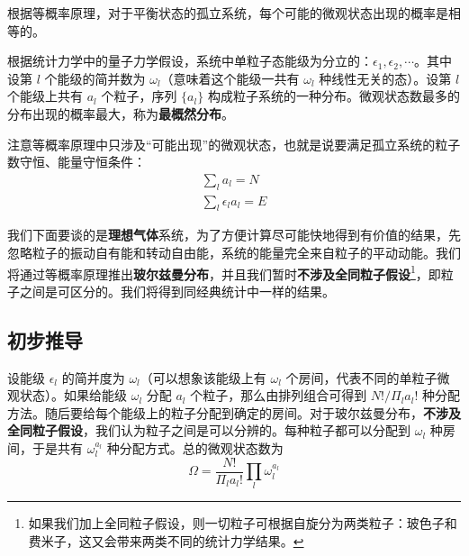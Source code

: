 

根据等概率原理，对于平衡状态的孤立系统，每个可能的微观状态出现的概率是相等的。

根据统计力学中的量子力学假设，系统中单粒子态能级为分立的：$\epsilon_1,\epsilon_2,\cdots$。其中设第 $l$ 个能级的简并数为 $\omega_l$（意味着这个能级一共有 $\omega_l$ 种线性无关的态）。设第 $l$ 个能级上共有 $a_l$ 个粒子，序列 $\{a_l\}$ 构成粒子系统的一种分布。微观状态数最多的分布出现的概率最大，称为\textbf{最概然分布}。

注意等概率原理中只涉及“可能出现”的微观状态，也就是说要满足孤立系统的粒子数守恒、能量守恒条件：
\begin{equation}\label{eq_MBsta_1}
\begin{aligned}
\sum_l a_l=N\\
\sum_l \epsilon_l a_l=E
\end{aligned}
\end{equation}

我们下面要谈的是\textbf{理想气体}系统，为了方便计算尽可能快地得到有价值的结果，先忽略粒子的振动自有能和转动自由能，系统的能量完全来自粒子的平动动能。我们将通过等概率原理推出\textbf{玻尔兹曼分布}，并且我们暂时\textbf{不涉及全同粒子假设}\footnote{如果我们加上全同粒子假设，则一切粒子可根据自旋分为两类粒子：玻色子和费米子，这又会带来两类不同的统计力学结果。}，即粒子之间是可区分的。我们将得到同经典统计中一样的结果。

\subsection{初步推导}
设能级 $\epsilon_l$ 的简并度为 $\omega_l$（可以想象该能级上有 $\omega_l$ 个房间，代表不同的单粒子微观状态）。如果给能级 $\omega_l$ 分配 $a_l$ 个粒子，那么由排列组合可得到 $N!/\Pi_l a_l!$ 种分配方法。随后要给每个能级上的粒子分配到确定的房间。对于玻尔兹曼分布，\textbf{不涉及全同粒子假设}，我们认为粒子之间是可以分辨的。每种粒子都可以分配到 $\omega_l$ 种房间，于是共有 $\omega_l^{a_l}$ 种分配方式。总的微观状态数为
\begin{equation}
\Omega=\frac{N!}{\Pi_l a_l!}\prod_l\omega_l^{a_l}
\end{equation}

